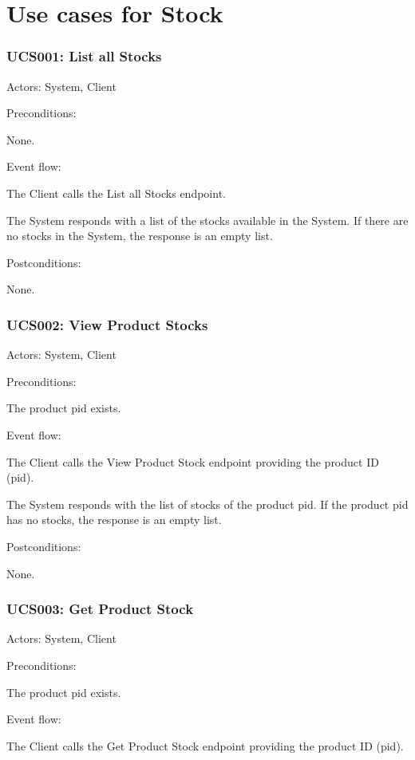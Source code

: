 \section{Use cases for Stock}

\subsubsection{UCS001: List all Stocks}
\label{UCS001}

Actors: System, Client

Preconditions:

\ucitem None.

Event flow:

\ucitem The Client calls the List all Stocks endpoint.

\ucitem The System responds with a list of the stocks available in the System. If there are no stocks in the System, the response is an empty list.

Postconditions:

\ucitem None.

\subsubsection{UCS002: View Product Stocks}
\label{UCS002}

Actors: System, Client

Preconditions: 

\ucitem The product pid exists.

Event flow:

\ucitem The Client calls the View Product Stock endpoint providing the product ID (pid).

\ucitem The System responds with the list of stocks of the product pid. If the product pid has no stocks, the response is an empty list.

Postconditions:

\ucitem None.

\subsubsection{UCS003: Get Product Stock}
\label{UCS003}

Actors: System, Client

Preconditions:

\ucitem The product pid exists.

Event flow:

\ucitem The Client calls the Get Product Stock endpoint providing the product ID (pid).

